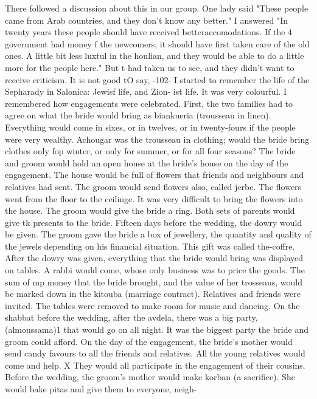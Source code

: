 {{There followed a discussion about this in our group.
One lady said "These people 
came from Arab countries, and they don't know any better."
I answered "In twenty years 
these people should have received betteraccomodations.
If the 4 government had money f 
the newcomers, it should have first taken care of the old ones.
A little bit less luxtul 
in the houlian, and they would be able to do a little more for the people here."
But t 
had taken us to see, and they didn't want to receive criticism.
It is not good tO 
say, 
-102- 
I started to remember the life of the Sepharady in Salonica: Jewisf life, and Zion-
ist life.
It was very colourful.
I remembered how engagements were celebrated.
First, 
the two families had to agree on what the bride would bring as biankueria (trousseau in 
linen).
Everything would come in sixes, or in twelves, or in twenty-fours if the people 
were very wealthy.
Achougar was the trousseau in clothing; would the bride bring clothes 
only fop winter, or only for summer, or for all four seasons?
The bride and groom would 
hold an open house at the bride's house on the day of the engagement.
The house would be 
full of flowers that friends and neighbours and relatives had sent.
The groom would send 
flowers also, called jerbe.
The flowers went from the floor to the ceilinge.
It was 
very difficult to bring the flowers into the house.
The groom would give the bride a 
ring.
Both sets of parents would give tk presents to the bride.
Fifteen days before the wedding, the dowry would be given.
The groom gave the bride 
a box of jewellery, the quantity and quality of the jewels depending on his financial 
situation.
This gift was called the-coffre.
After the dowry was given, everything that 
the bride would bring was displayed on tables.
A rabbi would come, whose only business 
was to price the goods.
The sum of mp money that the bride brought, and the value of her 
trosseaus, would be marked down in the kitouba (marriage contract).
Relatives and friends were invited.
The tables were removed to make room for music 
and dancing.
On the shabbat before the wedding, after the avdela, there was a big party, 
(almoussama)1 that would go on all night.
It was the biggest party the bride and groom 
could afford.
On the day of the engagement, the bride's mother would send candy favours to all the 
friends and relatives.
All the young relatives would come and help.
X They would all 
participate in the engagement of their cousins.
Before the wedding, the groom's mother 
would make korban (a sacrifice).
She would bake pitas and give them to everyone, neigh-
}}
